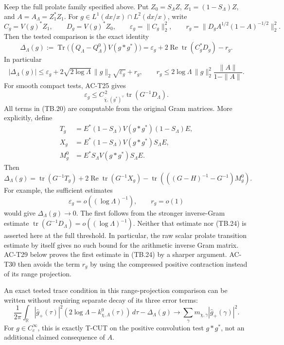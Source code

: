 \begin{proposition}
\label{AC-T26}
Keep the full prolate family specified above.  Put
\(Z_0=S_\Lambda Z\), \(Z_1=(1-S_\Lambda)Z\), and
\(A=A_\Lambda=Z_1^*Z_1\).
For \(g\in L^1(dx/x)\cap L^2(dx/x)\), write
\[
 C_g=V(g)^*Z_1,\qquad D_g=V(g)^*Z_0,\qquad
 \varepsilon_g=\|C_g\|_2^2,\qquad
 r_g=\|D_gA^{1/2}(1-A)^{-1/2}\|_2^2.
\]
Then the tested comparison is the exact identity
\[
 \Delta_\Lambda(g):=
 \operatorname{Tr}\bigl((Q_\Lambda-Q_\Lambda^0)V(g*g^*)\bigr)
 =\varepsilon_g+2\operatorname{Re}\operatorname{tr}(C_g^*D_g)-r_g.
 \tag{TB.20}
\]
In particular
\[
 |\Delta_\Lambda(g)|
 \leq\varepsilon_g+
         2\sqrt{2\log\Lambda}\,\|g\|_2\sqrt{\varepsilon_g}+r_g,
 \qquad
 r_g\leq2\log\Lambda\,\|g\|_2^2
                      \frac{\|A\|}{1-\|A\|}.
 \tag{TB.21}
\]
For smooth compact tests, AC-T25 gives
\[
 \varepsilon_g\leq
 C_{\overline\chi,(g^*)^\vee}^{\,2}
                         \operatorname{tr}(G^{-1}D_\Lambda).
 \tag{TB.22}
\]
All terms in (TB.20) are computable from the original Gram
matrices.  More explicitly, define
\[
 \begin{split}
 T_g&=E^*(1-S_\Lambda)V(g*g^*)(1-S_\Lambda)E,\\
 X_g&=E^*(1-S_\Lambda)V(g*g^*)S_\Lambda E,\\
 M_g^0&=E^*S_\Lambda V(g*g^*)S_\Lambda E.
 \end{split}
\]
Then
\[
 \Delta_\Lambda(g)=
 \operatorname{tr}(G^{-1}T_g)
 +2\operatorname{Re}\operatorname{tr}(G^{-1}X_g)
 -\operatorname{tr}\left(((G-H)^{-1}-G^{-1})M_g^0\right).
 \tag{TB.23}
\]
For example, the sufficient estimates
\[
 \varepsilon_g=o((\log\Lambda)^{-1}),\qquad r_g=o(1)
 \tag{TB.24}
\]
would give \(\Delta_\Lambda(g)\to0\).
The first follows from the stronger inverse-Gram estimate
\(\operatorname{tr}(G^{-1}D_\Lambda)=o((\log\Lambda)^{-1})\).
Neither that estimate nor (TB.24) is asserted here at the
full threshold.  In particular, the raw scalar prolate
transition estimate by itself gives no such bound for the
arithmetic inverse Gram matrix.
AC-T29 below proves the first estimate in (TB.24) by a
sharper argument.  AC-T30 then avoids the term \(r_g\) by
using the compressed positive contraction instead of its
range projection.

An exact tested trace condition in this range-projection
comparison can be written
without requiring separate decay of its three error terms:
\[
 \frac1{2\pi}\int_{\mathbb R}|\widehat g_+(\tau)|^2
                 (2\log\Lambda-k^0_{\chi,\Lambda}(\tau))\,d\tau
       -\Delta_\Lambda(g)
 \longrightarrow
       \sum_\gamma m_{\chi,\gamma}|\widehat g_+(\gamma)|^2.
 \tag{TB.25}
\]
For \(g\in C_c^\infty\), this is exactly T-CUT on the
positive convolution test \(g*g^*\), not an additional
claimed consequence of \(A\).
\end{proposition}

